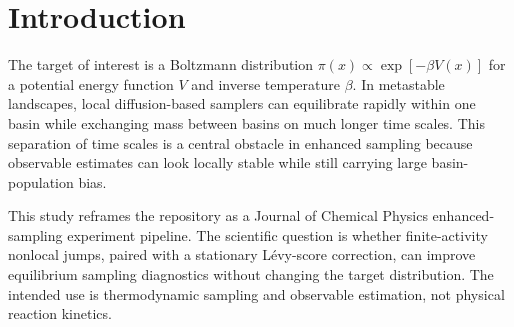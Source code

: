 \section{Introduction}
The target of interest is a Boltzmann distribution $\pi(x)\propto \exp[-\beta V(x)]$ for a potential energy function $V$ and inverse temperature $\beta$. In metastable landscapes, local diffusion-based samplers can equilibrate rapidly within one basin while exchanging mass between basins on much longer time scales. This separation of time scales is a central obstacle in enhanced sampling because observable estimates can look locally stable while still carrying large basin-population bias.

This study reframes the repository as a Journal of Chemical Physics enhanced-sampling experiment pipeline. The scientific question is whether finite-activity nonlocal jumps, paired with a stationary L\'evy-score correction, can improve equilibrium sampling diagnostics without changing the target distribution. The intended use is thermodynamic sampling and observable estimation, not physical reaction kinetics.
